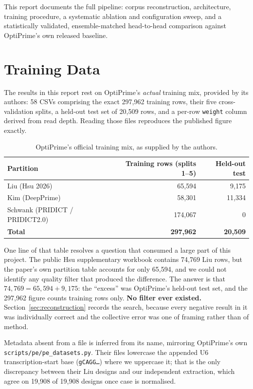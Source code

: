 \documentclass[11pt]{article}
\begin{document}
This report documents the full pipeline: corpus reconstruction, architecture,
training procedure, a systematic ablation and configuration sweep, and a
statistically validated, ensemble-matched head-to-head comparison against
OptiPrime's own released baseline.

\section{Training Data}
\label{sec:data}

The results in this report rest on OptiPrime's \emph{actual} training mix, provided
by its authors: 58 CSVs comprising the exact 297{,}962 training rows, their five
cross-validation splits, a held-out test set of 20{,}509 rows, and a per-row
\texttt{weight} column derived from read depth. Reading those files reproduces the
published figure exactly.

\begin{table}[H]
\centering
\caption{OptiPrime's official training mix, as supplied by the authors.}
\begin{tabular}{lrr}
\toprule
Partition & Training rows (splits 1--5) & Held-out test \\
\midrule
Liu (Hsu 2026) & 65{,}594 & 9{,}175 \\
Kim (DeepPrime) & 58{,}301 & 11{,}334 \\
Schwank (PRIDICT / PRIDICT2.0) & 174{,}067 & 0 \\
\midrule
\textbf{Total} & \textbf{297{,}962} & \textbf{20{,}509} \\
\bottomrule
\end{tabular}
\end{table}

One line of that table resolves a question that consumed a large part of this
project. The public Hsu supplementary workbook contains 74{,}769 Liu rows, but the
paper's own partition table accounts for only 65{,}594, and we could not identify
any quality filter that produced the difference. The answer is that
$74{,}769 = 65{,}594 + 9{,}175$: the ``excess'' was OptiPrime's held-out test set,
and the 297{,}962 figure counts training rows only. \textbf{No filter ever
existed.} Section~\ref{sec:reconstruction} records the search, because every
negative result in it was individually correct and the collective error was one of
framing rather than of method.

Metadata absent from a file is inferred from its name, mirroring OptiPrime's own
\texttt{scripts/pe/pe\_datasets.py}. Their files lowercase the appended U6
transcription-start base (\texttt{gCAGG\ldots}) where we uppercase it; that is the
only discrepancy between their Liu designs and our independent extraction, which
agree on 19{,}908 of 19{,}908 designs once case is normalised.
\end{document}
